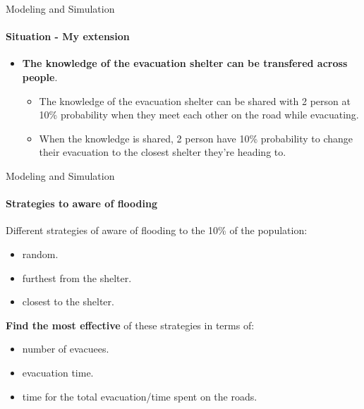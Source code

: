\documentclass{beamer}
\begin{document}
\begin{frame}[fragile]{Modeling and Simulation}
\framesubtitle{Situation - My extension}
\begin{itemize}
\item \textbf{The knowledge of the evacuation shelter can be transfered across people}.
\begin{itemize}
    \item The knowledge of the evacuation shelter can be shared with 2 person at 10\% probability when they meet each other on the road while evacuating.
    \item When the knowledge is shared, 2 person have 10\% probability to change their evacuation to the closest shelter they're heading to.
\end{itemize}
\end{itemize}
\end{frame}

\begin{frame}[fragile]{Modeling and Simulation}
\framesubtitle{Strategies to aware of flooding}

Different strategies of aware of flooding to the 10\% of the population:
\begin{itemize}
    \item random.
    \item furthest from the shelter.
    \item closest to the shelter.
\end{itemize}

\textbf{Find the most effective} of these strategies in terms of:
\begin{itemize}
    \item number of evacuees.
    \item evacuation time.
    \item time for the total evacuation/time spent on the roads.
\end{itemize}
\end{frame}




\end{document}
